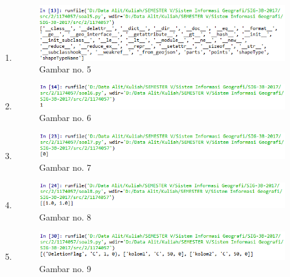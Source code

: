 \begin{enumerate}
	\item 
	
	\begin{figure}[H]
		\includegraphics[width=12cm]{figures/1174057/fajar5.PNG}
		\centering
		\caption{Gambar no. 5}
	\end{figure}
	
	\item 
	
	\begin{figure}[H]
		\includegraphics[width=12cm]{figures/1174057/fajar6.PNG}
		\centering
		\caption{Gambar no. 6}
	\end{figure}
	
	\item 
	
	\begin{figure}[H]
		\includegraphics[width=12cm]{figures/1174057/fajar7.PNG}
		\centering
		\caption{Gambar no. 7}
	\end{figure}
	
	\item 
	
	\begin{figure}[H]
		\includegraphics[width=12cm]{figures/1174057/fajar8.PNG}
		\centering
		\caption{Gambar no. 8}
	\end{figure}
	
	\item 
	
	\begin{figure}[H]
		\includegraphics[width=12cm]{figures/1174057/fajar9.PNG}
		\centering
		\caption{Gambar no. 9}
	\end{figure}


\end{enumerate}
